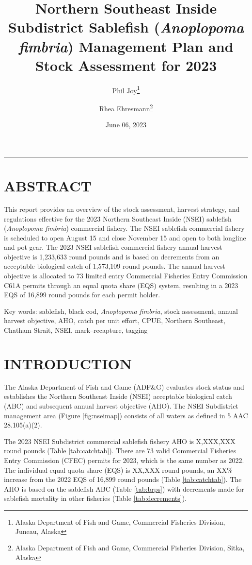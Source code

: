 \documentclass[
]{article}
\title{Northern Southeast Inside Subdistrict Sablefish (\emph{Anoplopoma fimbria}) Management Plan and Stock Assessment for 2023}
\author{Phil Joy\footnote{Alaska Department of Fish and Game, Commercial Fisheries Division, Juneau, Alaska} \and Rhea Ehresmann\footnote{Alaska Department of Fish and Game, Commercial Fisheries Division, Sitka, Alaska}}
\date{June 06, 2023}
\begin{document}
\maketitle

{
\setcounter{tocdepth}{2}
\tableofcontents
}
\begin{center}\rule{0.5\linewidth}{0.5pt}\end{center}

\hypertarget{abstract}{%
\section{ABSTRACT}\label{abstract}}

This report provides an overview of the stock assessment, harvest strategy, and regulations effective for the 2023 Northern Southeast Inside (NSEI) sablefish (\emph{Anoplopoma fimbria}) commercial fishery. The NSEI sablefish commercial fishery is scheduled to open August 15 and close November 15 and open to both longline and pot gear. The 2023 NSEI sablefish commercial fishery annual harvest objective is 1,233,633 round pounds and is based on decrements from an acceptable biological catch of 1,573,109 round pounds. The annual harvest objective is allocated to 73 limited entry Commercial Fisheries Entry Commission C61A permits through an equal quota share (EQS) system, resulting in a 2023 EQS of 16,899 round pounds for each permit holder.

Key words: sablefish, black cod, \emph{Anoplopoma fimbria}, stock assessment, annual harvest objective, AHO, catch per unit effort, CPUE, Northern Southeast, Chatham Strait, NSEI, mark--recapture, tagging

\hypertarget{introduction}{%
\section{INTRODUCTION}\label{introduction}}

The Alaska Department of Fish and Game (ADF\&G) evaluates stock status and establishes the Northern Southeast Inside (NSEI) acceptable biological catch (ABC) and subsequent annual harvest objective (AHO). The NSEI Subdistrict management area (Figure \ref{fig:nseimap}) consists of all waters as defined in 5 AAC 28.105(a)(2).

The 2023 NSEI Subdistrict commercial sablefish fishery AHO is {X,XXX,XXX} round pounds (Table \ref{tab:catchtab}). There are 73 valid Commercial Fisheries Entry Commission (CFEC) permits for 2023, which is the same number as 2022. The individual equal quota share (EQS) is {XX,XXX} round pounds, an {XX\%} increase from the 2022 EQS of 16,899 round pounds (Table \ref{tab:catchtab}). The AHO is based on the sablefish ABC (Table \ref{tab:brps}) with decrements made for sablefish mortality in other fisheries (Table \ref{tab:decrements}).
\end{document}
